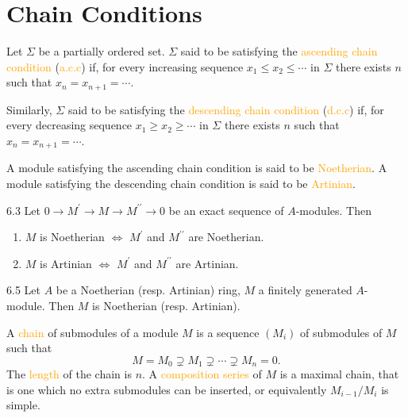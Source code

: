 \chapter{Chain Conditions}

Let $\Sigma$ be a partially ordered set. $\Sigma$ said to be satisfying the \textcolor{orange}{ascending chain condition} (\textcolor{orange}{a.c.c}) if, for every increasing sequence $x_1\leqslant x_2\leqslant\cdots$ in $\Sigma$ there exists $n$ such that $x_n=x_{n+1}=\cdots$.

Similarly, $\Sigma$ said to be satisfying the \textcolor{orange}{descending chain condition} (\textcolor{orange}{d.c.c}) if, for every decreasing sequence $x_1\geqslant x_2\geqslant\cdots$ in $\Sigma$ there exists $n$ such that $x_n=x_{n+1}=\cdots$.

A module satisfying the ascending chain condition is said to be \textcolor{orange}{Noetherian}. A module satisfying the descending chain condition is said to be \textcolor{orange}{Artinian}.

\begin{proposition}{6.3}
	Let $0\rightarrow M^\prime\rightarrow M\rightarrow M^{\prime\prime}\rightarrow0$ be an exact sequence of $A$-modules. Then
	\begin{enumerate}[label=\textup{(\roman*)}]
		\item $M$ is Noetherian $\Leftrightarrow$ $M^\prime$ and $M^{\prime\prime}$ are Noetherian.
		\item $M$ is Artinian $\Leftrightarrow$ $M^\prime$ and $M^{\prime\prime}$ are Artinian.
	\end{enumerate}
\end{proposition}

\begin{proposition}{6.5}
	Let $A$ be a Noetherian (resp. Artinian) ring, $M$ a finitely generated $A$-module. Then $M$ is Noetherian (resp. Artinian).
\end{proposition}

\begin{definition}
	A \textcolor{orange}{chain} of submodules of a module $M$ is a sequence $\left(M_i\right)$ of submodules of $M$ such that
	\begin{equation*}
		M=M_0\supsetneq M_1\supsetneq\cdots\supsetneq M_n=0.
	\end{equation*}
	The \textcolor{orange}{length} of the chain is $n$. A \textcolor{orange}{composition series} of $M$ is a maximal chain, that is one which no extra submodules can be inserted, or equivalently $M_{i-1}/M_i$ is simple.
\end{definition}


